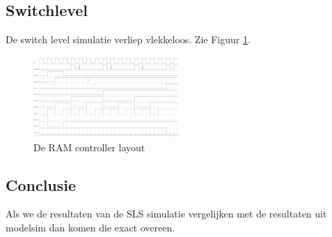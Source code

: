 \documentclass{scrreprt} %
\begin{document}
\subsection{Switchlevel}
De switch level simulatie verliep vlekkeloos. Zie Figuur \ref{fig:ramcontroller-sl-sim}.
\begin{figure}[H]
\centering
	\includegraphics[width=0.5\textwidth]{resources/wave_sls.png}
	\caption{De RAM controller layout}
	\label{fig:ramcontroller-sl-sim}
\end{figure}

\subsection{Conclusie}
Als we de resultaten van de SLS simulatie vergelijken met de resultaten uit modelsim dan komen die exact overeen.
\end{document}
